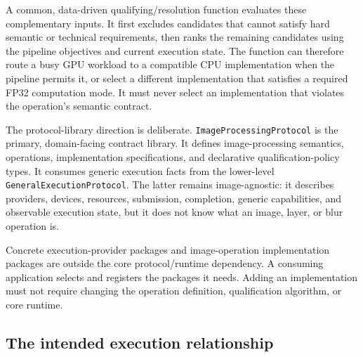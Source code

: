 \documentclass[11pt,a4paper,oneside]{article}
\begin{document}
A common, data-driven qualifying/resolution function evaluates these complementary inputs. It first excludes candidates that cannot satisfy hard semantic or technical requirements, then ranks the remaining candidates using the pipeline objectives and current execution state. The function can therefore route a busy GPU workload to a compatible CPU implementation when the pipeline permits it, or select a different implementation that satisfies a required FP32 computation mode. It must never select an implementation that violates the operation's semantic contract.

The protocol-library direction is deliberate. \texttt{ImageProcessing\allowbreak Protocol} is the primary, domain-facing contract library. It defines image-processing semantics, operations, implementation specifications, and declarative qualification-policy types. It consumes generic execution facts from the lower-level \texttt{GeneralExecution\allowbreak Protocol}. The latter remains image-agnostic: it describes providers, devices, resources, submission, completion, generic capabilities, and observable execution state, but it does not know what an image, layer, or blur operation is.

Concrete execution-provider packages and image-operation implementation packages are outside the core protocol/runtime dependency. A consuming application selects and registers the packages it needs. Adding an implementation must not require changing the operation definition, qualification algorithm, or core runtime.

\subsection{The intended execution relationship}
\end{document}

